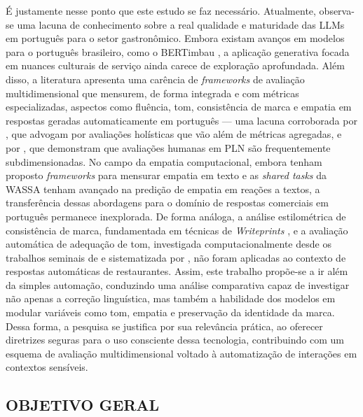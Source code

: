 É justamente nesse ponto que este estudo se faz necessário. Atualmente, observa-se uma lacuna de conhecimento sobre a real qualidade e maturidade das LLMs em português para o setor gastronômico. Embora existam avanços em modelos para o português brasileiro, como o BERTimbau \cite{souza2020}, a aplicação generativa focada em nuances culturais de serviço ainda carece de exploração aprofundada. Além disso, a literatura apresenta uma carência de \textit{frameworks} de avaliação multidimensional que mensurem, de forma integrada e com métricas especializadas, aspectos como fluência, tom, consistência de marca e empatia em respostas geradas automaticamente em português --- uma lacuna corroborada por \citet{liang2023}, que advogam por avaliações holísticas que vão além de métricas agregadas, e por \citet{howcroft2021}, que demonstram que avaliações humanas em PLN são frequentemente subdimensionadas. No campo da empatia computacional, embora \citet{sharma2020} tenham proposto \textit{frameworks} para mensurar empatia em texto e as \textit{shared tasks} da WASSA \cite{barriere2022,barriere2023,giorgi2024} tenham avançado na predição de empatia em reações a textos, a transferência dessas abordagens para o domínio de respostas comerciais em português permanece inexplorada. De forma análoga, a análise estilométrica de consistência de marca, fundamentada em técnicas de \textit{Writeprints} \cite{abbasi2008}, e a avaliação automática de adequação de tom, investigada computacionalmente desde os trabalhos seminais de \citet{danescu2013} e sistematizada por \citet{priya2024}, não foram aplicadas ao contexto de respostas automáticas de restaurantes. Assim, este trabalho propõe-se a ir além da simples automação, conduzindo uma análise comparativa capaz de investigar não apenas a correção linguística, mas também a habilidade dos modelos em modular variáveis como tom, empatia e preservação da identidade da marca. Dessa forma, a pesquisa se justifica por sua relevância prática, ao oferecer diretrizes seguras para o uso consciente dessa tecnologia, contribuindo com um esquema de avaliação multidimensional voltado à automatização de interações em contextos sensíveis.



\subsection{OBJETIVO GERAL}

